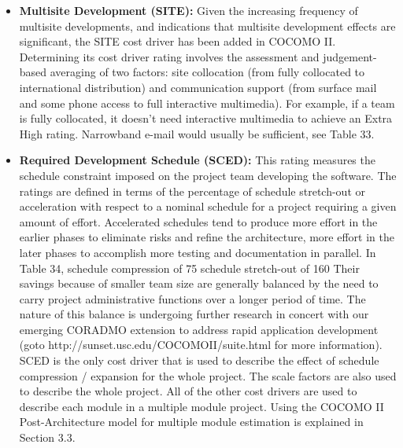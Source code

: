 \begin{itemize}
	\item\textbf{Multisite Development (SITE):} Given the increasing frequency of multisite developments, and indications that multisite
	development effects are significant, the SITE cost driver has been added in COCOMO II.
	Determining its cost driver rating involves the assessment and judgement-based averaging of two
	factors: site collocation (from fully collocated to international distribution) and communication
	support (from surface mail and some phone access to full interactive multimedia).
	For example, if a team is fully collocated, it doesn’t need interactive multimedia to
	achieve an Extra High rating. Narrowband e-mail would usually be sufficient, see Table 33. 
	
	\item\textbf{Required Development Schedule (SCED):} This rating measures the schedule constraint imposed on the project team developing the
	software. The ratings are defined in terms of the percentage of schedule stretch-out or
	acceleration with respect to a nominal schedule for a project requiring a given amount of effort.
	Accelerated schedules tend to produce more effort in the earlier phases to eliminate risks and
	refine the architecture, more effort in the later phases to accomplish more testing and
	documentation in parallel. In Table 34, schedule compression of 75%
	schedule stretch-out of 160%
	Their savings because of smaller team size are generally balanced by the need to carry project
	administrative functions over a longer period of time. The nature of this balance is undergoing further research in concert with our emerging CORADMO extension to address rapid application
	development (goto http://sunset.usc.edu/COCOMOII/suite.html for more information).
	SCED is the only cost driver that is used to describe the effect of schedule compression /
	expansion for the whole project. The scale factors are also used to describe the whole project.
	All of the other cost drivers are used to describe each module in a multiple module project.
	Using the COCOMO II Post-Architecture model for multiple module estimation is explained in
	Section 3.3. 
	
	
\end{itemize}

\vspace{10mm}


